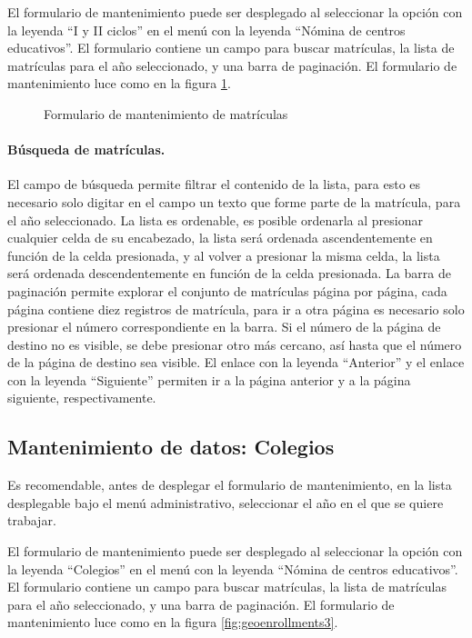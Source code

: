\documentclass[a4paper, 9pt, conference]{article}              %
\begin{document}
El formulario de mantenimiento puede ser desplegado al seleccionar la opci\'on con la leyenda ``I y II ciclos'' en el men\'u con la leyenda ``N\'omina de centros educativos''. El formulario contiene un campo para buscar matr\'iculas, la lista de matr\'iculas para el a\~no seleccionado, y una barra de paginaci\'on. El formulario de mantenimiento luce como en la figura \ref{fig:geoenrollments2}.

\begin{figure}
	\centering
		\caption{Formulario de mantenimiento de matr\'iculas}
	\label{fig:geoenrollments2}
\end{figure}


\paragraph{B\'usqueda de matr\'iculas.}

El campo de b\'usqueda permite filtrar el contenido de la lista, para esto es necesario solo digitar en el campo un texto que forme parte de la matr\'icula, para el a\~no seleccionado. La lista es ordenable, es posible ordenarla al presionar cualquier celda de su encabezado, la lista ser\'a ordenada ascendentemente en funci\'on de la celda presionada, y al volver a presionar la misma celda, la lista ser\'a ordenada descendentemente en funci\'on de la celda presionada. La barra de paginaci\'on permite explorar el conjunto de matr\'iculas p\'agina por p\'agina, cada p\'agina contiene diez registros de matr\'icula, para ir a otra p\'agina es necesario solo presionar el n\'umero correspondiente en la barra. Si el n\'umero de la p\'agina de destino no es visible, se debe presionar otro m\'as cercano, as\'i hasta que el n\'umero de la p\'agina de destino sea visible. El enlace con la leyenda ``Anterior'' y el enlace con la leyenda ``Siguiente'' permiten ir a la p\'agina anterior y a la p\'agina siguiente, respectivamente.


\subsection{Mantenimiento de datos: Colegios}
Es recomendable, antes de desplegar el formulario de mantenimiento, en la lista desplegable bajo el men\'u administrativo, seleccionar el a\~no en el que se quiere trabajar.

El formulario de mantenimiento puede ser desplegado al seleccionar la opci\'on con la leyenda ``Colegios'' en el men\'u con la leyenda ``N\'omina de centros educativos''. El formulario contiene un campo para buscar matr\'iculas, la lista de matr\'iculas para el a\~no seleccionado, y una barra de paginaci\'on. El formulario de mantenimiento luce como en la figura \ref{fig:geoenrollments3}.
\end{document}
